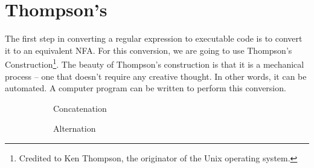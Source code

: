 \documentclass[letterpaper,12pt,openany,reqno]{book}%
\newcommand{\faterminalnode}[3] {\draw (#1) circle [radius=9pt]; \node at (#1) (#2) [circle, draw, minimum size=24pt] {#2};}
\newcommand{\fastart}[1] {\coordinate (start) at (#1);}
\newcommand{\fanonterminalnode}[2] {\node at (#1) (#2) [circle, draw, minimum size=24pt] {#2};}
\newcommand{\fatransition}[3] {\draw [-{Latex[length=3mm,width=2.5mm]}] (#1) -- (#2) node [midway, above] {#3};}
\begin{document}
\section{Thompson's}

The first step in converting a regular expression to executable code is to convert it to an equivalent NFA. For this conversion, we are going to use Thompson's Construction\footnote{Credited to Ken Thompson, the originator of the Unix operating system.}. The beauty of Thompson's construction is that it is a mechanical process -- one that doesn't require any creative thought. In other words, it can be automated. A computer program can be written to perform this conversion.

\begin{figure}[htb]
\centering

\begin{subfigure}[b]{0.45\textwidth}
\centering
{}
\caption{Concatenation}\label{F.Thompsons.Concatenation}
\end{subfigure}

\begin{subfigure}[b]{0.45\textwidth}
\centering
{}
\caption{Alternation}\label{F.Thompsons.Alternation}
\end{subfigure}

\begin{subfigure}[b]{0.45\textwidth}
\centering
\end{subfigure}
\end{figure}
\end{document}
